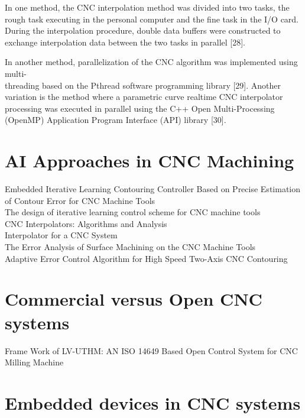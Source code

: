 In one method, the CNC interpolation method was divided into two tasks, the rough task executing in the personal computer and the fine task in the I/O card. During the interpolation procedure, double data buffers were constructed to exchange interpolation data between the two tasks in parallel [28].
\vspace*{1\baselineskip}

In another method, parallelization of the CNC algorithm was implemented using multi-\\ threading based on the Pthread software programming library [29]. Another variation is the method where a parametric curve realtime CNC interpolator processing was executed in parallel using the C++ Open Multi-Processing (OpenMP) Application Program Interface (API) library [30].
\vspace*{1\baselineskip}

\section{AI Approaches in CNC Machining}

\cite{Hendrawan_2018} Embedded Iterative Learning Contouring Controller Based on Precise Estimation of Contour Error for CNC Machine Tools\\
\cite{Tingting_2016} The design of iterative learning control scheme for CNC machine tools\\
\cite{Koren_1993} CNC Interpolators: Algorithms and Analysis\\
\cite{Koren_1976} Interpolator for a CNC System\\
\cite{Zheng_2014} The Error Analysis of Surface Machining on the {CNC} Machine Tools\\
\cite{Dong_2013} Adaptive Error Control Algorithm for High Speed Two-Axis {CNC} Contouring\\

\section{Commercial versus Open CNC systems}

\cite{Yusri_2013} Frame Work of LV-UTHM: AN ISO 14649 Based Open Control System for CNC Milling Machine\\


\section{Embedded devices in CNC systems}

